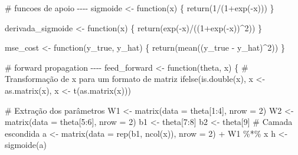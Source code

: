 \documentclass[
  a4paperpaper,
]{article}
\newenvironment{Shaded}{\begin{snugshade}}{\end{snugshade}}
\newcommand{\AttributeTok}[1]{\textcolor[rgb]{0.40,0.45,0.13}{#1}}
\newcommand{\CommentTok}[1]{\textcolor[rgb]{0.37,0.37,0.37}{#1}}
\newcommand{\ControlFlowTok}[1]{\textcolor[rgb]{0.00,0.23,0.31}{#1}}
\newcommand{\DecValTok}[1]{\textcolor[rgb]{0.68,0.00,0.00}{#1}}
\newcommand{\FunctionTok}[1]{\textcolor[rgb]{0.28,0.35,0.67}{#1}}
\newcommand{\NormalTok}[1]{\textcolor[rgb]{0.00,0.23,0.31}{#1}}
\newcommand{\OtherTok}[1]{\textcolor[rgb]{0.00,0.23,0.31}{#1}}
\newcommand{\SpecialCharTok}[1]{\textcolor[rgb]{0.37,0.37,0.37}{#1}}
\begin{document}
\begin{Shaded}
\begin{Highlighting}[]
\CommentTok{\# funcoes de apoio {-}{-}{-}{-}}
\NormalTok{sigmoide }\OtherTok{\textless{}{-}} \ControlFlowTok{function}\NormalTok{(x) \{}
  \FunctionTok{return}\NormalTok{(}\DecValTok{1}\SpecialCharTok{/}\NormalTok{(}\DecValTok{1}\SpecialCharTok{+}\FunctionTok{exp}\NormalTok{(}\SpecialCharTok{{-}}\NormalTok{x)))}
\NormalTok{\}}

\NormalTok{derivada\_sigmoide }\OtherTok{\textless{}{-}} \ControlFlowTok{function}\NormalTok{(x) \{}
  \FunctionTok{return}\NormalTok{(}\FunctionTok{exp}\NormalTok{(}\SpecialCharTok{{-}}\NormalTok{x)}\SpecialCharTok{/}\NormalTok{((}\DecValTok{1}\SpecialCharTok{+}\FunctionTok{exp}\NormalTok{(}\SpecialCharTok{{-}}\NormalTok{x))}\SpecialCharTok{\^{}}\DecValTok{2}\NormalTok{))}
\NormalTok{\}}

\NormalTok{mse\_cost }\OtherTok{\textless{}{-}} \ControlFlowTok{function}\NormalTok{(y\_true, y\_hat) \{}
  \FunctionTok{return}\NormalTok{(}\FunctionTok{mean}\NormalTok{((y\_true }\SpecialCharTok{{-}}\NormalTok{ y\_hat)}\SpecialCharTok{\^{}}\DecValTok{2}\NormalTok{))}
\NormalTok{\}}

\CommentTok{\# forward propagation {-}{-}{-}{-}}
\NormalTok{feed\_forward }\OtherTok{\textless{}{-}} \ControlFlowTok{function}\NormalTok{(theta, x) \{}
\CommentTok{\# Transformação de x para um formato de matriz}
  \FunctionTok{ifelse}\NormalTok{(}\FunctionTok{is.double}\NormalTok{(x), x }\OtherTok{\textless{}{-}} \FunctionTok{as.matrix}\NormalTok{(x), x }\OtherTok{\textless{}{-}} \FunctionTok{t}\NormalTok{(}\FunctionTok{as.matrix}\NormalTok{(x)))}
  
  \CommentTok{\# Extração dos parâmetros}
\NormalTok{  W1 }\OtherTok{\textless{}{-}} \FunctionTok{matrix}\NormalTok{(}\AttributeTok{data =}\NormalTok{ theta[}\DecValTok{1}\SpecialCharTok{:}\DecValTok{4}\NormalTok{], }\AttributeTok{nrow =} \DecValTok{2}\NormalTok{)}
\NormalTok{  W2 }\OtherTok{\textless{}{-}} \FunctionTok{matrix}\NormalTok{(}\AttributeTok{data =}\NormalTok{ theta[}\DecValTok{5}\SpecialCharTok{:}\DecValTok{6}\NormalTok{], }\AttributeTok{nrow =} \DecValTok{2}\NormalTok{)}
\NormalTok{  b1 }\OtherTok{\textless{}{-}}\NormalTok{ theta[}\DecValTok{7}\SpecialCharTok{:}\DecValTok{8}\NormalTok{]}
\NormalTok{  b2 }\OtherTok{\textless{}{-}}\NormalTok{ theta[}\DecValTok{9}\NormalTok{]}
  \CommentTok{\# Camada escondida}
\NormalTok{  a }\OtherTok{\textless{}{-}} \FunctionTok{matrix}\NormalTok{(}\AttributeTok{data =} \FunctionTok{rep}\NormalTok{(b1, }\FunctionTok{ncol}\NormalTok{(x)), }\AttributeTok{nrow =} \DecValTok{2}\NormalTok{) }\SpecialCharTok{+}\NormalTok{ W1 }\SpecialCharTok{\%*\%}\NormalTok{ x}
\NormalTok{  h }\OtherTok{\textless{}{-}} \FunctionTok{sigmoide}\NormalTok{(a)}
  

\end{Highlighting}
\end{Shaded}
\end{document}
